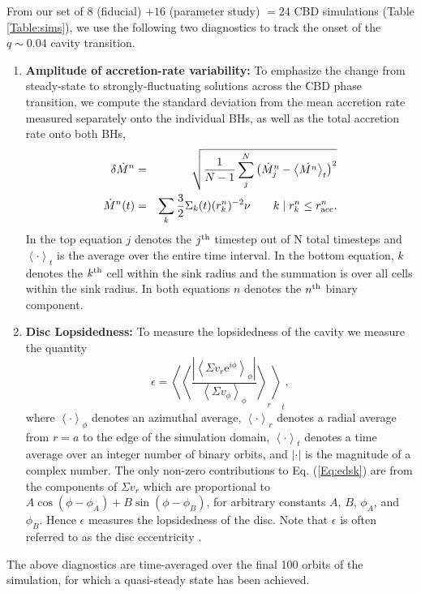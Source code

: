 \documentclass[usenatbib]{mnras}
\begin{document}
From our set of $8$ (fiducial) $+16$ (parameter study) $=24$ CBD
simulations (Table \ref{Table:sims}), we use the following two
diagnostics to track the onset of the $q\sim 0.04$ cavity transition.
\begin{enumerate}
\item \textbf{Amplitude of accretion-rate variability:} To emphasize
  the change from steady-state to strongly-fluctuating solutions
  across the CBD phase transition, we compute the standard deviation
  from the mean accretion rate measured separately onto the individual
  BHs, as well as the total accretion rate onto both BHs,
\begin{eqnarray}
\delta \dot{M}^{n} &=& \sqrt{\frac{1}{N-1} \sum^N_j \left(\dot{M}^n_j -   \left<\dot{M^n}\right>_t \right)^{2}} \nonumber \\
\dot{M}^n(t) &=& \sum_{k} \frac{3}{2} \Sigma_k (t) (r^n_k)^{-2} \nu \qquad k \mid r^n_k \leq r^n_{\rm acc}.
\label{Eq:Mdot}
\end{eqnarray}
In the top equation $j$ denotes the
$j^{\rm th}$ timestep out of N total timesteps and $\left< \cdot \right>_{t}$ is the average over the entire time interval. In the bottom equation, $k$ denotes the $k^{\rm th}$ cell within the sink radius and the summation is over all cells within the sink radius. In both equations $n$ denotes the $n^{\rm th}$ binary component.
\item \textbf{Disc Lopsidedness:} To measure the lopsidedness of the
  cavity we measure the quantity
\begin{equation}
\epsilon = \left< \left< \frac{ \left| \left< \Sigma v_r \mbox{e}^{i \phi} \right>_{\phi} \right| }{\left< \Sigma v_{\phi}\right>_{\phi}}\right>_{r} \right>_{t},
\label{Eq:edsk}
\end{equation}
where $\left< \cdot \right>_{\phi}$ denotes an azimuthal average, $\left< \cdot \right>_{r}$ 
denotes a radial average from $r=a$ to the edge of the simulation domain, $\left< \cdot \right>_{t}$ 
denotes a time average over an integer number of binary orbits,
and $| \cdot |$ is the magnitude of a complex number. The only non-zero 
contributions to Eq. (\ref{Eq:edsk}) are from the components of $\Sigma v_r$ 
which are proportional to $A\cos{(\phi - \phi_A)} + B\sin{(\phi - \phi_B)}$, 
for arbitrary constants $A$, $B$, $\phi_A$, and $\phi_B$. Hence $\epsilon$ 
measures the lopsidedness of the disc. Note that $\epsilon$ is often referred to as the 
disc eccentricity \citep[{\em e.g.},][]{MacFadyen:2008,Farris:2014}.
\end{enumerate}
The above diagnostics are time-averaged over the final 100 orbits of
the simulation, for which a quasi-steady state has been achieved.
\\
\end{document}
